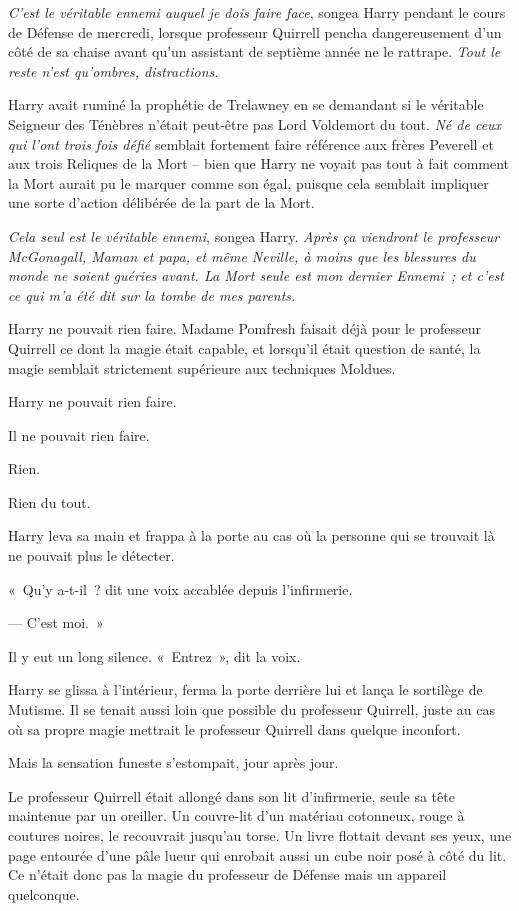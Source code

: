 \emph{C'est le véritable ennemi auquel je dois faire face}, songea Harry pendant le cours de Défense de mercredi, lorsque professeur Quirrell pencha dangereusement d'un côté de sa chaise avant qu'un assistant de septième année ne le rattrape. \emph{Tout le reste n'est qu'ombres, distractions.}

Harry avait ruminé la prophétie de Trelawney en se demandant si le véritable Seigneur des Ténèbres n'était peut-être pas Lord Voldemort du tout. \emph{Né de ceux qui l'ont trois fois défié} semblait fortement faire référence aux frères Peverell et aux trois Reliques de la Mort -- bien que Harry ne voyait pas tout à fait comment la Mort aurait pu le marquer comme son égal, puisque cela semblait impliquer une sorte d'action délibérée de la part de la Mort.

\emph{Cela seul est le véritable ennemi}, songea Harry. \emph{Après ça viendront le professeur McGonagall, Maman et papa, et même Neville, à moins que les blessures du monde ne soient guéries avant. La Mort seule est mon dernier Ennemi~; et c'est ce qui m'a été dit sur la tombe de mes parents.}

Harry ne pouvait rien faire. Madame Pomfresh faisait déjà pour le professeur Quirrell ce dont la magie était capable, et lorsqu'il était question de santé, la magie semblait strictement supérieure aux techniques Moldues.

Harry ne pouvait rien faire.

Il ne pouvait rien faire.

Rien.

Rien du tout.

\later

Harry leva sa main et frappa à la porte au cas où la personne qui se trouvait là ne pouvait plus le détecter.

«~Qu'y a-t-il~? dit une voix accablée depuis l'infirmerie.

--- C'est moi.~»

Il y eut un long silence. «~Entrez~», dit la voix.

Harry se glissa à l'intérieur, ferma la porte derrière lui et lança le sortilège de Mutisme. Il se tenait aussi loin que possible du professeur Quirrell, juste au cas où sa propre magie mettrait le professeur Quirrell dans quelque inconfort.

Mais la sensation funeste s'estompait, jour après jour.

Le professeur Quirrell était allongé dans son lit d'infirmerie, seule sa tête maintenue par un oreiller. Un couvre-lit d'un matériau cotonneux, rouge à coutures noires, le recouvrait jusqu'au torse. Un livre flottait devant ses yeux, une page entourée d'une pâle lueur qui enrobait aussi un cube noir posé à côté du lit. Ce n'était donc pas la magie du professeur de Défense mais un appareil quelconque.

